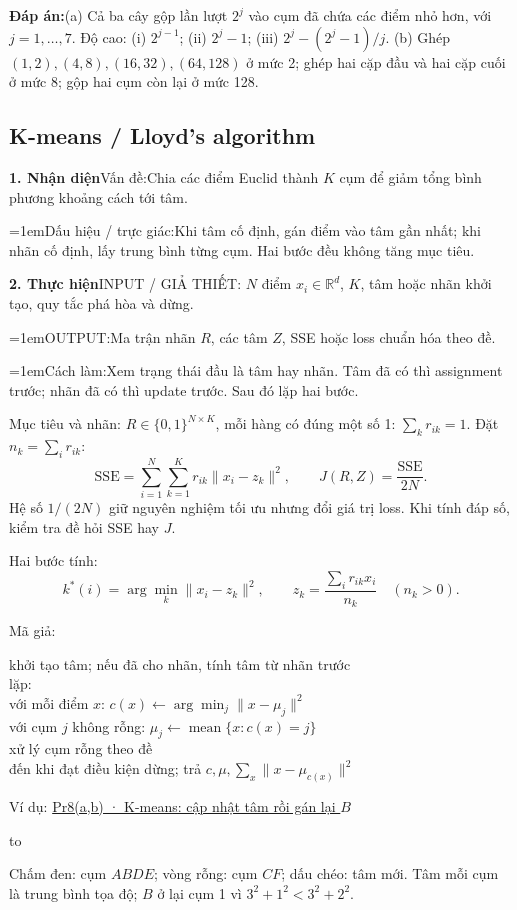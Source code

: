 \documentclass[10pt,a4paper,twocolumn]{article}
\makeatletter
\newif\ifexamheadingprinted
\newcommand{\topic}[2]{%
  \global\examheadingprintedfalse\par\subsection{#2}\label{topic:#1}}
\newcommand{\key}[1]{#1:\enspace}
\newcommand{\blocklabel}[1]{\par\noindent#1\par\nobreak}
\newcommand{\finalanswer}[1]{%
  \par\addvspace{3pt}\noindent\textbf{Đáp án:}\nobreak\enspace#1\par}
\newcommand{\qlink}[2]{\hyperref[question:#1]{#2}}
\newenvironment{example}[2]{%
  \par\addvspace{6pt}\noindent
  \raggedright
  \blocklabel{Ví dụ: \qlink{#1}{#2}}%
}{\par\addvspace{4pt}}
\newenvironment{diagram}{%
  \par\addvspace{3pt}\noindent\hbox to \linewidth\bgroup\hfil
}{\hfil\egroup\par\addvspace{3pt}}
\newcommand{\algfield}[2]{\par\noindent\hangindent=1em\relax#1:\enspace#2}
\newcommand{\unitfield}[4]{%
  \par\noindent\textbf{#1. #2}\enspace #3:\enspace #4}
\newcommand{\algsummary}[6]{%
  \begingroup\setlength{\parskip}{1pt}%
  \unitfield{1}{Nhận diện}{Vấn đề}{#1}%
  \algfield{Dấu hiệu / trực giác}{#2}%
  \if\relax\detokenize{#3}\relax\else\par\noindent#3\par\fi%
  \unitfield{2}{Thực hiện}{INPUT / GIẢ THIẾT}{#4}%
  \algfield{OUTPUT}{#5}%
  \algfield{Cách làm}{#6}\par\endgroup}
\newenvironment{algpseudo}{%
  \par\addvspace{2pt}\noindent
  \setlength{\parskip}{0pt}%
  Mã giả:\par\nobreak
  \begin{list}{}{\setlength{\leftmargin}{1em}\setlength{\topsep}{0pt}%
    \setlength{\partopsep}{0pt}\setlength{\parsep}{0pt}%
    \@beginparpenalty=10000\relax}%
  \item\relax
}{\end{list}\par\addvspace{3pt}}
\makeatother
\begin{document}
\finalanswer{(a) Cả ba cây gộp lần lượt $2^j$ vào cụm đã chứa các điểm nhỏ hơn, với $j=1,\ldots,7$. Độ cao: (i) $2^{j-1}$; (ii) $2^j-1$; (iii) $2^j-(2^j-1)/j$. (b) Ghép $(1,2),(4,8),(16,32),(64,128)$ ở mức 2; ghép hai cặp đầu và hai cặp cuối ở mức 8; gộp hai cụm còn lại ở mức 128.}
\topic{kmeans}{K-means / Lloyd's algorithm}

\algsummary{Chia các điểm Euclid thành $K$ cụm để giảm tổng bình phương khoảng cách tới tâm.}{Khi tâm cố định, gán điểm vào tâm gần nhất; khi nhãn cố định, lấy trung bình từng cụm. Hai bước đều không tăng mục tiêu.}{}{ $N$ điểm $x_i\in\mathbb R^d$, $K$, tâm hoặc nhãn khởi tạo, quy tắc phá hòa và dừng.}{Ma trận nhãn $R$, các tâm $Z$, SSE hoặc loss chuẩn hóa theo đề.}{Xem trạng thái đầu là tâm hay nhãn. Tâm đã có thì assignment trước; nhãn đã có thì update trước. Sau đó lặp hai bước.}

\key{Mục tiêu và nhãn} $R\in\{0,1\}^{N\times K}$, mỗi hàng có đúng một số 1: $\sum_k r_{ik}=1$. Đặt $n_k=\sum_i r_{ik}$:
\[
\mathrm{SSE}=\sum_{i=1}^N\sum_{k=1}^K r_{ik}\|x_i-z_k\|^2,
\qquad J(R,Z)=\frac{\mathrm{SSE}}{2N}.
\]
Hệ số $1/(2N)$ giữ nguyên nghiệm tối ưu nhưng đổi giá trị loss. Khi tính đáp số, kiểm tra đề hỏi SSE hay $J$.

\key{Hai bước tính}
\[
k^*(i)=\arg\min_k\|x_i-z_k\|^2,
\qquad
z_k=\frac{\sum_i r_{ik}x_i}{n_k}\quad(n_k>0).
\]

\begin{algpseudo}
khởi tạo tâm; nếu đã cho nhãn, tính tâm từ nhãn trước\\
lặp:\\
\quad với mỗi điểm $x$: $c(x)\gets\arg\min_j\|x-\mu_j\|^2$\\
\quad với cụm $j$ không rỗng: $\mu_j\gets\operatorname{mean}\{x:c(x)=j\}$\\
\quad xử lý cụm rỗng theo đề\\
đến khi đạt điều kiện dừng; trả $c,\mu,\sum_x\|x-\mu_{c(x)}\|^2$
\end{algpseudo}

\begin{example}{Pr8}{Pr8(a,b) · K-means: cập nhật tâm rồi gán lại $B$}
\begin{diagram}
\end{diagram}
Chấm đen: cụm $ABDE$; vòng rỗng: cụm $CF$; dấu chéo: tâm mới. Tâm mỗi cụm là trung bình tọa độ; $B$ ở lại cụm 1 vì $3^2+1^2<3^2+2^2$.
\end{example}
\end{document}
